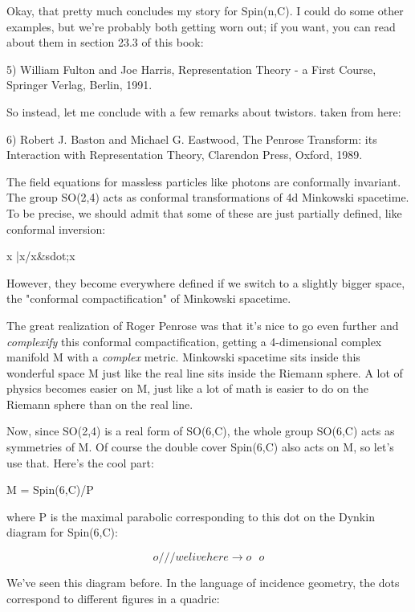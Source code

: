 Okay, that pretty much concludes my story for Spin(n,C).  I could
do some other examples, but we're probably both getting worn out;
if you want, you can read about them in section 23.3 of this book:

5)  William Fulton and Joe Harris, Representation Theory - a First
Course, Springer Verlag, Berlin, 1991.

So instead, let me conclude with a few remarks about twistors.
taken from here:

6) Robert J. Baston and Michael G. Eastwood, The Penrose Transform:
its Interaction with Representation Theory, Clarendon Press, Oxford,
1989.

The field equations for massless particles like photons are conformally
invariant.  The group SO(2,4) acts as conformal transformations of 4d
Minkowski spacetime.  To be precise, we should admit that some of these
are just partially defined, like conformal inversion:

x |\to  x/x&sdot;x

However, they become everywhere defined if we switch to a slightly
bigger space, the "conformal compactification" of Minkowski spacetime.

The great realization of Roger Penrose was that it's nice to go even
further and \emph{complexify} this conformal compactification, getting a
4-dimensional complex manifold M with a \emph{complex} metric.  Minkowski
spacetime sits inside this wonderful space M just like the real line
sits inside the Riemann sphere.  A lot of physics becomes easier on M,
just like a lot of math is easier to do on the Riemann sphere than on
the real line.

Now, since SO(2,4) is a real form of SO(6,C), the whole group 
SO(6,C) acts as symmetries of M.  Of course the double cover 
Spin(6,C) also acts on M, so let's use that.  Here's the cool part:

M = Spin(6,C)/P 

where P is the maximal parabolic corresponding to this dot on
the Dynkin diagram for Spin(6,C):


$$

                          o
                         /
                        /
                       /
     we live here \to   o
                       \
                        \
                         \
                          o
$$
    
We've seen this diagram before.  In the language of incidence geometry,
the dots correspond to different figures in a quadric:



